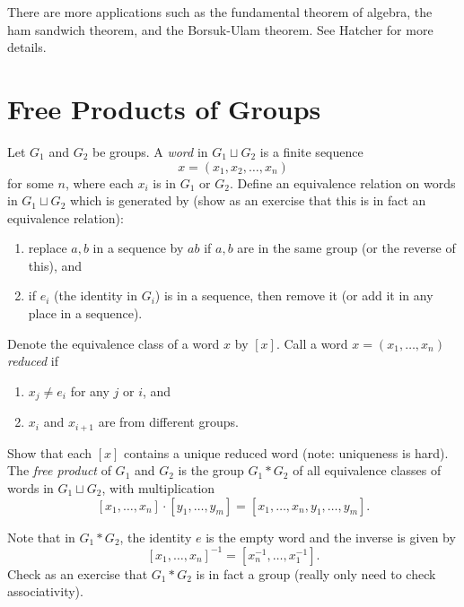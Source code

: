 \begin{remark}
  There are more applications such as the
  fundamental theorem of algebra, the ham sandwich
  theorem, and the Borsuk-Ulam theorem. See Hatcher
  for more details.
\end{remark}

\section{Free Products of Groups}

\begin{definition}
  Let $G_1$ and $G_2$ be groups. A \emph{word} in
  $G_1 \sqcup G_2$ is a finite sequence
  \[
    x = (x_1, x_2, \dots, x_n)
  \]
  for some $n$, where each $x_i$ is in $G_1$ or $G_2$.
  Define an equivalence relation on words in
  $G_1 \sqcup G_2$ which is generated by (show as
  an exercise that this is in fact an equivalence
  relation):
  \begin{enumerate}
    \item replace $a, b$ in a sequence by $ab$ if
      $a, b$ are in the same group (or the reverse of this), and
    \item if $e_i$ (the identity in $G_i$) is in
      a sequence, then remove it (or add it in any
      place in a sequence).
  \end{enumerate}
  Denote the equivalence class of a word $x$ by $[x]$.
  Call a word $x = (x_1, \dots, x_n)$ \emph{reduced} if
  \begin{enumerate}
    \item $x_j \ne e_i$ for any $j$ or $i$, and
    \item $x_i$ and $x_{i + 1}$ are from different
      groups.
  \end{enumerate}
  Show that each $[x]$ contains a unique reduced word
  (note: uniqueness is hard).
  The \emph{free product} of $G_1$ and $G_2$ is
  the group $G_1 * G_2$ of all equivalence classes of
  words in $G_1 \sqcup G_2$, with multiplication
  \[
    [x_1, \dots, x_n] \cdot [y_1, \dots, y_m]
    = [x_1, \dots, x_n, y_1, \dots, y_m].
  \]
\end{definition}

\begin{remark}
  Note that in $G_1 * G_2$, the identity
  $e$ is the empty word and the inverse is given by
  \[[x_1, \dots, x_n]^{-1} = [x_n^{-1}, \dots, x_1^{-1}].\]
  Check as an exercise that $G_1 * G_2$ is in
  fact a group (really only need to check associativity).
\end{remark}

